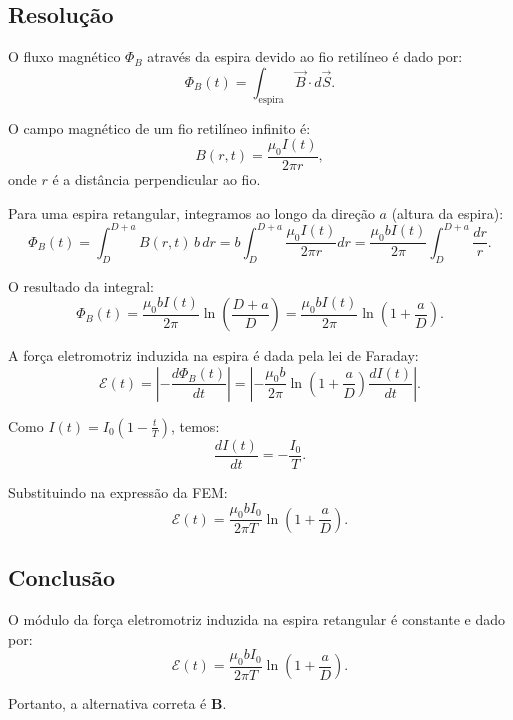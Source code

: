 \documentclass[a4paper,12pt]{article}
\begin{document}
\begin{flushleft}
\subsection*{Resolução}

O fluxo magnético $\Phi_B$ através da espira devido ao fio retilíneo é dado por:
\[
\Phi_B(t) = \int_{\text{espira}} \vec{B} \cdot d\vec{S}.
\]

O campo magnético de um fio retilíneo infinito é:
\[
B(r,t) = \frac{\mu_0 I(t)}{2\pi r},
\]
onde $r$ é a distância perpendicular ao fio.

Para uma espira retangular, integramos ao longo da direção $a$ (altura da espira):
\[
\Phi_B(t) = \int_{D}^{D+a} B(r,t) \, b \, dr = b \int_{D}^{D+a} \frac{\mu_0 I(t)}{2\pi r} dr = \frac{\mu_0 b I(t)}{2\pi} \int_{D}^{D+a} \frac{dr}{r}.
\]

O resultado da integral:
\[
\Phi_B(t) = \frac{\mu_0 b I(t)}{2\pi} \ln\left(\frac{D+a}{D}\right) = \frac{\mu_0 b I(t)}{2\pi} \ln\left(1 + \frac{a}{D}\right).
\]

A força eletromotriz induzida na espira é dada pela lei de Faraday:
\[
\mathcal{E}(t) = \left| - \frac{d\Phi_B(t)}{dt} \right| = \left| - \frac{\mu_0 b}{2\pi} \ln\left(1 + \frac{a}{D}\right) \frac{d I(t)}{dt} \right|.
\]

Como $I(t) = I_0 \left(1 - \frac{t}{T}\right)$, temos:
\[
\frac{d I(t)}{dt} = - \frac{I_0}{T}.
\]

Substituindo na expressão da FEM:
\[
\mathcal{E}(t) = \frac{\mu_0 b I_0}{2\pi T} \ln\left(1 + \frac{a}{D}\right).
\]

\subsection*{Conclusão}

O módulo da força eletromotriz induzida na espira retangular é constante e dado por:
\[
\boxed{\mathcal{E}(t) = \frac{\mu_0 b I_0}{2\pi T} \ln\left(1 + \frac{a}{D}\right)}.
\]

Portanto, a alternativa correta é \colorbox{green!50}{\textbf{B}}.

\end{flushleft}
\end{document}
